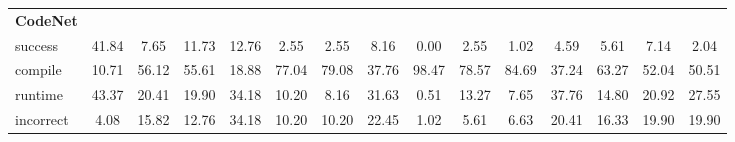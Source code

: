 \begin{table}[t]
\begin{tabular}{@{}lcccccccccccccc@{}}
\textbf{CodeNet} & & & & & & & & & & & & & & \\ 
\quad success & 41.84 & 7.65 & 11.73 & 12.76 & 2.55 & 2.55 & 8.16 & 0.00 & 2.55 & 1.02 & 4.59 & 5.61 & 7.14 & 2.04 \\
\qquad compile & 10.71 & 56.12 & 55.61 & 18.88 & 77.04 & 79.08 & 37.76 & 98.47 & 78.57 & 84.69 & 37.24 & 63.27 & 52.04 & 50.51 \\
\qquad runtime & 43.37 & 20.41 & 19.90 & 34.18 & 10.20 & 8.16 & 31.63 & 0.51 & 13.27 & 7.65 & 37.76 & 14.80 & 20.92 & 27.55 \\
\qquad incorrect & 4.08 & 15.82 & 12.76 & 34.18 & 10.20 & 10.20 & 22.45 & 1.02 & 5.61 & 6.63 & 20.41 & 16.33 & 19.90 & 19.90 \\
 

\bottomrule
\end{tabular}
\end{table}





